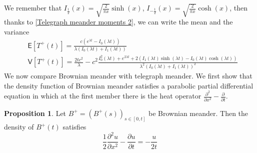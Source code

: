 \documentclass{article}
\theoremstyle{definition}
\newtheorem{proposition}{Proposition}[section]
\numberwithin{equation}{section}
\begin{document}
We remember that $I_{\frac{1}{2}}(x) = \sqrt{\frac{2}{\pi x}}\sinh(x)$, $I_{-\frac{1}{2}}(x) = \sqrt{\frac{2}{\pi x}}\cosh(x)$, then thanks to \eqref{Telegraph meander moments 2}, we can write the mean and the variance 
\begin{align}
&\mathsf{E}[T^+(t)] = \frac{c(e^{\lambda t}-I_0(\lambda t))}{\lambda(I_0(\lambda t)+I_1(\lambda t))} \label{Telegraph meander first moment}\\
&\mathsf{V}[T^+(t)] =  \frac{2tc^2}{\lambda}- c^2\frac{I^2_0(\lambda t)+e^{2\lambda t}+2(I_1(\lambda t)\sinh(\lambda t)-I_0(\lambda t)\cosh(\lambda t))}{\lambda^2(I_0(\lambda t)+I_1(\lambda t))^2} \label{Telegraph meander second moment}
\end{align}
We now compare Brownian meander with telegraph meander. We first show that the density function of Brownian meander satisfies a parabolic partial differential equation in which at the first member there is the heat operator $\frac{\partial^2}{\partial x^2}-\frac{\partial}{\partial t}$.
\begin{proposition}
Let $B^+ = (B^+(s))_{s \in [0,t]}$ be Brownian meander. Then the density of $B^+(t)$ satisfies
\begin{equation}\label{pde Brownian meander 2}
\frac{1}{2}\frac{\partial^2u}{\partial x^2} - \frac{\partial u}{\partial t}=- \frac{u}{2t}
\end{equation}
\end{proposition}
\end{document}
